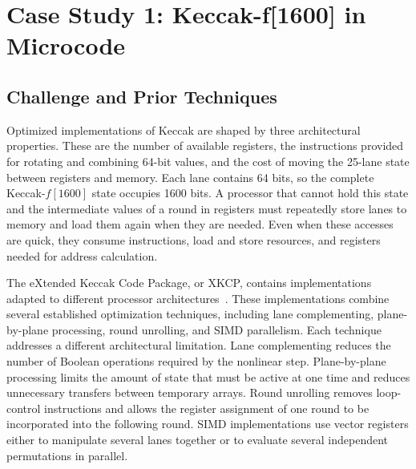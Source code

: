 \documentclass[journal=tches,submission]{iacrtrans}
\newcommand{\yvali}[1]{\todo[inline,color=darkviolet]{\textcolor{white}{\textbf{Yuval:} #1}}}
\newcommand{\yval}[1]{\todo[color=darkviolet,size=\footnotesize]{\textcolor{white}{\textbf{Yuval:} #1}}}
\begin{document}
\section{Case Study 1: Keccak-f[1600] in Microcode}
\label{sec:keccak}



\subsection{Challenge and Prior Techniques}
\label{sec:keccak-challenge}

Optimized implementations of Keccak are shaped by three architectural properties.
These are the number of available registers, the instructions provided for rotating and combining 64-bit values, and the cost of moving the 25-lane state between registers and memory.
Each lane contains 64 bits, so the complete Keccak-$f[1600]$ state occupies 1600 bits.
A processor that cannot hold this state and the intermediate values of a round in registers must repeatedly store lanes to memory and load them again when they are needed.
Even when these accesses are quick, they consume instructions, load and store resources, and registers needed for address calculation.

The eXtended Keccak Code Package, or XKCP, contains implementations adapted to different processor architectures~\cite{XKCP}.
These implementations combine several established optimization techniques, including lane complementing, plane-by-plane processing, round unrolling, and SIMD parallelism.
Each technique addresses a different architectural limitation.
Lane complementing reduces the number of Boolean operations required by the nonlinear step.
Plane-by-plane processing limits the amount of state that must be active at one time and reduces unnecessary transfers between temporary arrays.
Round unrolling removes loop-control instructions and allows the register assignment of one round to be incorporated into the following round.
SIMD implementations use vector registers either to manipulate several lanes together or to evaluate several independent permutations in parallel.
\end{document}
